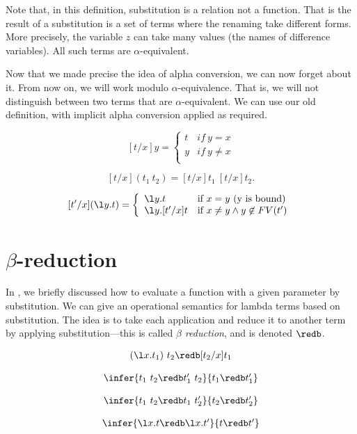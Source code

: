 Note that, in this definition, substitution is a relation not a
function.  That is the result of a substitution is a set of terms
where the renaming take different forms.  More precisely, the variable
$z$ can take many values (the names of difference variables).  All
such terms are $\alpha$-equivalent. 

Now that we made precise the idea of alpha conversion, we can now
forget about it.  From now on, we will work modulo
$\alpha$-equivalence.  That is, we will not distinguish between two
terms that are $\alpha$-equivalent.  We can use our old definition,
with implicit alpha conversion applied as required.


\begin{definition}
\label{def:lambda:sub-final}
\[
[t/x]y = \left\{ \begin{array}{ll}
        t & if~y = x \\
        y & if~y\neq x \\
        \end{array} \right.
\]


\[
[t/x](t_1~t_2) = [t/x]t_1~[t/x]t_2.
 \]

\[
[t'/x](\l y.t) = 
\left\{ \begin{array}{ll}

\l y.t &\mbox{if}~ x = y \mbox{ (y is bound)} \\

\l y.[t'/x]t &\mbox{if}~ x \neq y \land y \not \in FV(t') \\

\end{array} \right. 
\]
\end{definition}

\section{$\beta$-reduction}

In , we briefly discussed how to evaluate a
function with a given parameter by substitution.  We can give an
operational semantics for lambda terms based on substitution.  The
idea is to take each application and reduce it to another term by
applying substitution---this is called \emph{$\beta$ reduction}, and is
denoted $\redb$.

\begin{definition}
\[
\begin{array}{c}
(\l x.t_1)~t_2 \redb [t_2/x] t_1 \\[4mm]
\infer{t_1~t_2 \redb t_1'~t_2}{t_1 \redb t'_1}\\[4mm]
\infer{t_1~t_2 \redb t_1~t'_2}{t_2 \redb t'_2}\\[4mm]
\infer{\l x.t \redb \l x.t'} {t \redb t'}
\end{array}
\]
\end{definition}


